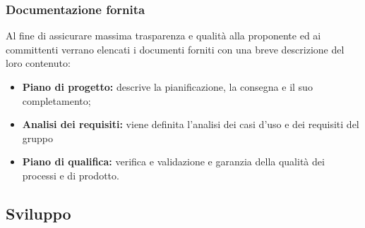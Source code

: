 \documentclass{article}
\begin{document}
    \subsubsection{Documentazione fornita}
    Al fine di assicurare massima trasparenza e qualità alla proponente ed ai committenti verrano elencati i documenti forniti con una breve descrizione del loro contenuto:
    \begin{itemize}
        \item \textbf{Piano di progetto:} descrive la pianificazione, la consegna e il suo completamento;
        \item \textbf{Analisi dei requisiti:} viene definita l'analisi dei casi d'uso e dei requisiti del gruppo
        \item \textbf{Piano di qualifica:} verifica e validazione e garanzia della qualità dei processi e di prodotto.
    \end{itemize}
    \subsection{Sviluppo}
\end{document}
